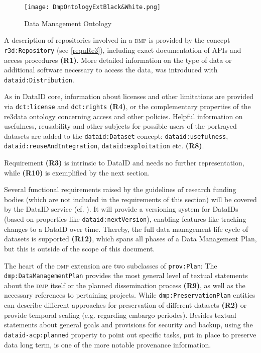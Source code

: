 \documentclass[runningheads,a4paper]{llncs}
\newcommand{\dmp}{{\scshape dmp}\xspace}
\newcommand{\prop}[1]{{{\texttt{#1}}}}
\begin{document}
\begin{figure}
\centering
\texttt{[image: DmpOntologyExtBlack\&White.png]}
  \caption{Data Management Ontology}
  \label{fig:dmp}
  \vspace{-1.5em}
\end{figure}

A description of repositories involved in a \dmp is provided by the concept \prop{r3d:Repository} (see \ref{requRe3}), including exact documentation of APIs and access procedures \textbf{(R1)}. More detailed information on the type of data or additional software necessary to access the data, was introduced with \prop{dataid:Distribution}.

As in DataID core, information about licenses and other limitations are provided via \prop{dct:license} and \prop{dct:rights} \textbf{(R4)}, or the complementary properties of the re3data ontology concerning access and other policies.
Helpful information on usefulness, reusability and other subjects for possible users of the portrayed datasets are added to the \prop{dataid:Dataset} concept: \prop{dataid:usefulness}, \prop{dataid:reuseAndIntegration}, \prop{dataid:exploitation} etc. \textbf{(R8)}.

Requirement \textbf{(R3)} is intrinsic to DataID and needs no further representation, while \textbf{(R10)} is exemplified by the next section.

Several functional requirements raised by the guidelines of research funding bodies (which are not included in the requirements of this section) will be covered by the DataID service (cf. ). It will provide a versioning system for DataIDs (based on properties like \prop{dataid:nextVersion}), enabling features like tracking changes to a DataID over time.
Thereby, the full data management life cycle of datasets is supported \textbf{(R12)}, which spans all phases of a Data Management Plan, but this is outside of the scope of this document.

The heart of the \dmp extension are two subclasses of \prop{prov:Plan}:
The \prop{dmp:DataManagementPlan} provides the most general level of textual statements about the \dmp itself or the planned dissemination process \textbf{(R9)}, as well as the necessary references to pertaining projects. While \prop{dmp:PreservationPlan} entities can describe different approaches for preservation of different datasets \textbf{(R2)} or provide temporal scaling (e.g. regarding embargo periodes). Besides textual statements about general goals and provisions for security and backup, using the \prop{dataid-acp:planned} property to point out specific tasks, put in place to preserve data long term, is one of the more notable provenance information.
\end{document}
